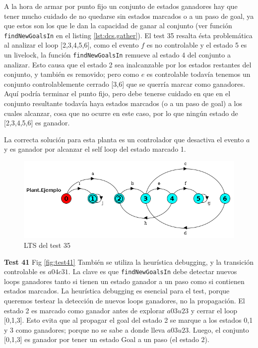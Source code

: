 A la hora de armar por punto fijo un conjunto de estados ganadores hay que tener mucho cuidado de no quedarse sin estados marcados o a un paso de goal, ya que estos son los que le dan la capacidad de ganar al conjunto (ver función \texttt{findNewGoalsIn} en el listing \ref{lst:dcs.gather}). El test 35 resalta ésta problemática al analizar el loop [2,3,4,5,6], como el evento $f$ es no controlable y el estado 5 es un livelock, la función \texttt{findNewGoalsIn} remueve al estado 4 del conjunto a analizar. Esto causa que el estado 2 sea inalcanzable por los estados restantes del conjunto, y también es removido; pero como $e$ es controlable todavía tenemos un conjunto controlablemente cerrado [3,6] que se querría marcar como ganadores. Aquí podría terminar el punto fijo, pero debe tenerse cuidado en que en el conjunto resultante todavía haya estados marcados (o a un paso de goal) a los cuales alcanzar, cosa que no ocurre en este caso, por lo que ningún estado de [2,3,4,5,6] es ganador.

La correcta solución para esta planta es un controlador que desactiva el evento $a$ y es ganador por alcanzar el self loop del estado marcado 1.

\begin{figure}[h]
 \centering
 \includegraphics[scale=0.7]{figures/tests/test35.png}
 \caption{LTS del test 35}
 \label{fig:test35}
\end{figure}

\FloatBarrier
\textbf{Test 41} Fig \ref{fig:test41}
También se utiliza la heurística debugging, y la transición controlable es $a04c31$. 
La clave es que \texttt{findNewGoalsIn} debe detectar nuevos loops ganadores tanto si tienen un estado ganador a un paso como si contienen estados marcados. 
La heurística debugging es esencial para el test, porque queremos testear la detección de nuevos loops ganadores, no la propagación. El estado 2 es marcado como ganador antes de explorar $a03u23$ y cerrar el loop [0,1,3]. Esto evita que al propagar el goal del estado 2 se marque a los estados 0,1 y 3 como ganadores; porque no se sabe a donde lleva $a03u23$.
Luego, el conjunto [0,1,3] es ganador por tener un estado Goal a un paso (el estado $2$).

